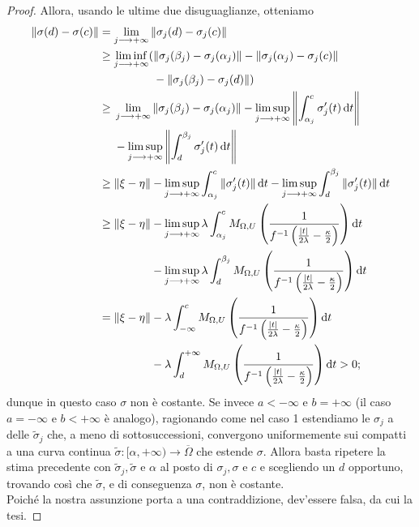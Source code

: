 \begin{proof}
    Allora, usando le ultime due disuguaglianze, otteniamo
    \begin{align*}
        \|\sigma(d)-\sigma(c)\|&=\lim_{j\longrightarrow+\infty}\|\sigma_j(d)-\sigma_j(c)\|\\
        &\ge\begin{aligned}[t]\liminf_{j\longrightarrow+\infty}(&\|\sigma_j(\beta_j)-\sigma_j(\alpha_j)\|-\|\sigma_j(\alpha_j)-\sigma_j(c)\|\\
        &-\|\sigma_j(\beta_j)-\sigma_j(d)\|)\end{aligned}\\
        &\ge\begin{aligned}[t]&\lim_{j\longrightarrow+\infty}\|\sigma_j(\beta_j)-\sigma_j(\alpha_j)\|-\limsup_{j\longrightarrow+\infty}\left\|\int_{\alpha_j}^c \sigma_j'(t)\diff t\right\|\\
        &-\limsup_{j\longrightarrow+\infty}\left\|\int_d^{\beta_j} \sigma_j'(t)\diff t\right\|\end{aligned}\\
        &\ge\|\xi-\eta\|-\limsup_{j\longrightarrow+\infty}\int_{\alpha_j}^c \|\sigma_j'(t)\|\diff t-\limsup_{j\longrightarrow+\infty}\int_d^{\beta_j} \|\sigma_j'(t)\|\diff t\\
        &\ge\begin{aligned}[t]\|\xi-\eta\|&-\limsup_{j\longrightarrow+\infty}\lambda\int_{\alpha_j}^c M_{\Omega,U}\left(\frac{1}{f^{-1}\left(\frac{|t|}{2\lambda}-\frac{\kappa}{2}\right)}\right)\diff t\\
        &-\limsup_{j\longrightarrow+\infty}\lambda\int_d^{\beta_j} M_{\Omega,U}\left(\frac{1}{f^{-1}\left(\frac{|t|}{2\lambda}-\frac{\kappa}{2}\right)}\right)\diff t\end{aligned}\\
        &=\begin{aligned}[t]\|\xi-\eta\|&-\lambda\int_{-\infty}^c M_{\Omega,U}\left(\frac{1}{f^{-1}\left(\frac{|t|}{2\lambda}-\frac{\kappa}{2}\right)}\right)\diff t\\
        &-\lambda\int_d^{+\infty} M_{\Omega,U}\left(\frac{1}{f^{-1}\left(\frac{|t|}{2\lambda}-\frac{\kappa}{2}\right)}\right)\diff t>0;\end{aligned}
    \end{align*}
    dunque in questo caso $\sigma$ non è costante. Se invece $a<-\infty$ e $b=+\infty$ (il caso $a=-\infty$ e $b<+\infty$ è analogo), ragionando come nel caso 1 estendiamo le $\sigma_j$ a delle $\tilde{\sigma}_j$ che, a meno di sottosuccessioni, convergono uniformemente sui compatti a una curva continua $\tilde{\sigma}:[\alpha,+\infty)\longrightarrow\overline{\Omega}$ che estende $\sigma$. Allora basta ripetere la stima precedente con $\tilde{\sigma}_j, \tilde{\sigma}$ e $\alpha$ al posto di $\sigma_j, \sigma$ e $c$ e scegliendo un $d$ opportuno, trovando così che $\tilde{\sigma}$, e di conseguenza $\sigma$, non è costante. \\

    Poiché la nostra assunzione porta a una contraddizione, dev'essere falsa, da cui la tesi.
\end{proof}


